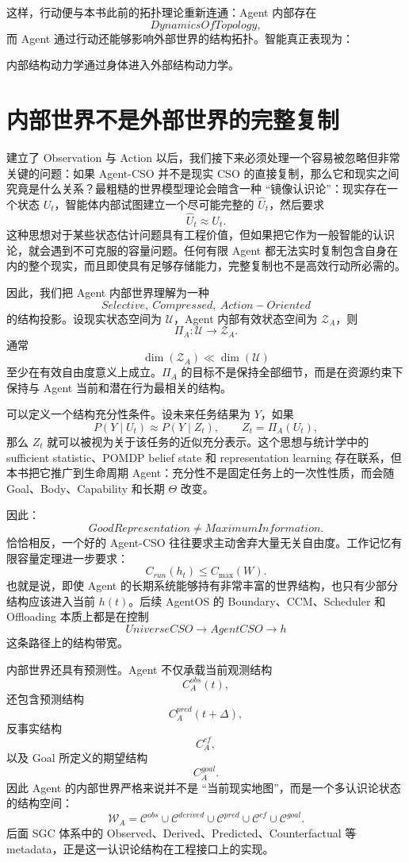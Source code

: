 这样，行动便与本书此前的拓扑理论重新连通：Agent 内部存在
\[
DynamicsOfTopology,
\]
而 Agent 通过行动还能够影响外部世界的结构拓扑。智能真正表现为：
\begin{statementbox}
内部结构动力学通过身体进入外部结构动力学。
\end{statementbox}


\section{内部世界不是外部世界的完整复制}

建立了 Observation 与 Action 以后，我们接下来必须处理一个容易被忽略但非常关键的问题：如果 Agent-CSO 并不是现实 CSO 的直接复制，那么它和现实之间究竟是什么关系？最粗糙的世界模型理论会暗含一种 ``镜像认识论''：现实存在一个状态 $U_t$，智能体内部试图建立一个尽可能完整的 $\hat U_t$，然后要求
\[
\hat U_t
\approx
U_t.
\]
这种思想对于某些状态估计问题具有工程价值，但如果把它作为一般智能的认识论，就会遇到不可克服的容量问题。任何有限 Agent 都无法实时复制包含自身在内的整个现实，而且即使具有足够存储能力，完整复制也不是高效行动所必需的。

因此，我们把 Agent 内部世界理解为一种
\[
\boxed{
Selective,\ Compressed,\ Action-Oriented
}
\]
的结构投影。设现实状态空间为 $\mathcal U$，Agent 内部有效状态空间为 $\mathcal Z_A$，则
\[
\Pi_A:\mathcal U\rightarrow\mathcal Z_A.
\]
通常
\[
\dim(\mathcal Z_A)
\ll
\dim(\mathcal U)
\]
至少在有效自由度意义上成立。$\Pi_A$ 的目标不是保持全部细节，而是在资源约束下保持与 Agent 当前和潜在行为最相关的结构。

可以定义一个结构充分性条件。设未来任务结果为 $Y$，如果
\[
P(Y\mid U_t)
\approx
P(Y\mid Z_t),
\qquad
Z_t=\Pi_A(U_t),
\]
那么 $Z_t$ 就可以被视为关于该任务的近似充分表示。这个思想与统计学中的 sufficient statistic、POMDP belief state 和 representation learning 存在联系，但本书把它推广到生命周期 Agent：充分性不是固定任务上的一次性性质，而会随 Goal、Body、Capability 和长期 $\Theta$ 改变。

因此：
\[
\boxed{
GoodRepresentation
\neq
MaximumInformation.
}
\]
恰恰相反，一个好的 Agent-CSO 往往要求主动舍弃大量无关自由度。工作记忆有限容量定理进一步要求：
\[
C_{run}(h_t)
\leq
C_{\max}(W).
\]
也就是说，即使 Agent 的长期系统能够持有非常丰富的世界结构，也只有少部分结构应该进入当前 $h(t)$。后续 AgentOS 的 Boundary、CCM、Scheduler 和 Offloading 本质上都是在控制
\[
UniverseCSO
\rightarrow
AgentCSO
\rightarrow
h
\]
这条路径上的结构带宽。

内部世界还具有预测性。Agent 不仅承载当前观测结构
\[
C_A^{obs}(t),
\]
还包含预测结构
\[
C_A^{pred}(t+\Delta),
\]
反事实结构
\[
C_A^{cf},
\]
以及 Goal 所定义的期望结构
\[
C_A^{goal}.
\]
因此 Agent 的内部世界严格来说并不是 ``当前现实地图''，而是一个多认识论状态的结构空间：
\[
\mathcal W_A
=
\mathcal C^{obs}
\cup
\mathcal C^{derived}
\cup
\mathcal C^{pred}
\cup
\mathcal C^{cf}
\cup
\mathcal C^{goal}.
\]
后面 SGC 体系中的 Observed、Derived、Predicted、Counterfactual 等 metadata，正是这一认识论结构在工程接口上的实现。

